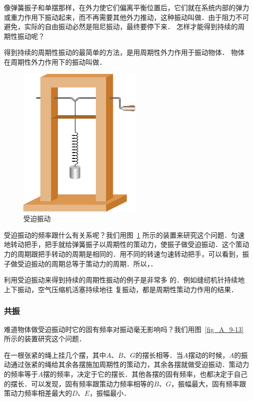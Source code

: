 像弹簧振子和单摆那样，在外力使它们偏离平衡位置后，它们就在系统内部的弹力或重力作用下振动起来，而不再需要其他外力推动，这种振动叫做．由于阻力不可避免，实际的自由振动必然是阻尼振动，最终要停下来．
怎样才能得到持续的周期性振动呢？

得到持续的周期性振动的最简单的方法，是用周期性外力作用于振动物体．
物体在周期性外力作用下的振动叫做．
\begin{figure}[htbp]
    \centering
    \includegraphics{fig/A/9-12.pdf}
    \caption{受迫振动}\label{fig_A_9-12}
\end{figure}

受迫振动的频率跟什么有关系呢？我们用图~\ref{fig_A_9-12} 所示的装置来研究这个问题．匀速地转动把手，把手就给弹簧振子以周期性的策动力，使振子做受迫振动．这个策动力的周期跟把手转动的周期是相同的．用不同的转速匀速转动把手，可以看到，振子做受迫振动的周期总等于策动力的周期．所以，．

利用受迫振动来得到持续的周期性振动的例子是非常多
的．例如缝纫机针持续地上下振动，空气压缩机活塞持续地往
复振动，都是周期性策动力作用的结果．

\subsubsection{共振}

难道物体做受迫振动时它的固有频率对振动毫无影响吗？我们用图~\ref{fig_A_9-13} 所示的装置研究这个问题．

在一根张紧的绳上挂几个摆，其中$A$、$B$、$G$的摆长相等．当$A$摆动的时候，$A$的振动通过张紧的绳给其余各摆施加周期性的策动力，其余各摆就做受迫振动．策动力的频率等于$A$摆的频率，决定于它的摆长．其他各摆的固有频率，也都决定于自己的摆长．可以发现，固有频率跟策动力频率相等的$B$、$G$，振幅最大，固有频率跟策动力频率相差最大的$D$、$E$，振幅最小．

